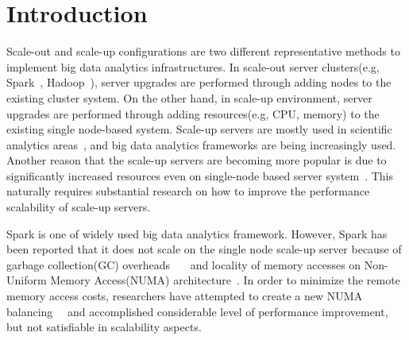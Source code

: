 \section{Introduction} \label{sec:introduction}
\label{sec:introduction}
Scale-out and scale-up configurations are two different representative methods to implement 
big data analytics infrastructures. 
In scale-out server clusters(e.g, Spark~\cite{Zaharia2012RDD},
Hadoop~\cite{Shvachko2010HDF}), server upgrades are performed through adding nodes to 
the existing cluster system. 
On the other hand, in scale-up environment, server upgrades are performed 
through adding resources(e.g, CPU, memory) to the existing single node-based system.
Scale-up servers are mostly used in scientific analytics areas~\cite{Chaimov2016SSH}, 
and big data analytics frameworks are being increasingly used.
Another reason that the scale-up servers are becoming more popular is due to 
significantly increased resources even on single-node based server system~\cite{Appuswamy2013SVS}.
This naturally requires substantial research on how to improve the performance 
scalability of scale-up servers.

Spark is one of widely used big data analytics framework.
However, Spark has been reported that it does
not scale on the single node scale-up server because of garbage
collection(GC)
overheads~\cite{Ahsan2016SVS}~\cite{Ousterhout2015MSP}~\cite{Maas2016THL} and
locality of memory accesses on Non-Uniform Memory Access(NUMA)
architecture~\cite{Cao2016ADS}.
In order to minimize the remote memory access costs, researchers have
attempted to create a new NUMA balancing~\cite{Dashti2013TMH}~\cite{AutoNUMA} and 
accomplished considerable level of performance improvement, but not satisfiable in 
scalability aspects. 

